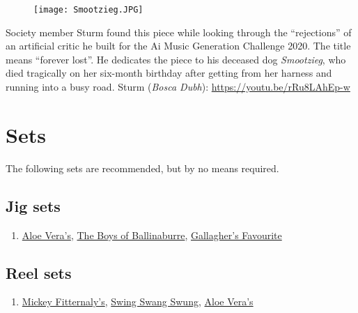 \documentclass[a4paper,notitlepage,twoside]{book}
\begin{document}
{}  
\hypertarget{piece:EvigtForlorad}{}
\begin{figure}
\vspace{-0.3in}
\texttt{[image: Smootzieg.JPG]}
\end{figure}
Society member Sturm found this piece while looking through
the ``rejections'' of an artificial critic he built for the 
Ai Music Generation Challenge 2020.
The title means ``forever lost''.
He dedicates the piece to his deceased dog {\em Smootzieg},
who died tragically on her six-month birthday after 
getting from her harness and running into a busy road.
Sturm ({\em Bosca Dubh}): \url{https://youtu.be/rRu8LAhEp-w}


\chapter{Sets}
The following sets are recommended, 
but by no means required.

\section{Jig sets}
\begin{enumerate}
\item \hyperlink{jig:AloeVeras}{Aloe Vera's}, \hyperlink{jig:BoysofBallinaburre}{The Boys of Ballinaburre}, \hyperlink{jig:GallaghersFavourite}{Gallagher's Favourite}
\end{enumerate}

\section{Reel sets}
\begin{enumerate}
\item \hyperlink{reel:MickeyFitternalys}{Mickey Fitternaly's}, \hyperlink{reel:SwingSwangSwung}{Swing Swang Swung}, \hyperlink{reel:AloeVeras}{Aloe Vera's}  
\end{enumerate}


\clearpage
\printindex

\backmatter 

\end{document}
